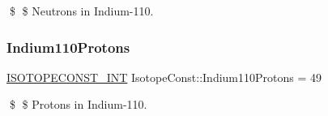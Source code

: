 \$ \$ Neutrons in Indium-\/110. \mbox{\label{group___isotope_const-_indium-_in110_ga3eb5f874d2904cc25ff4b0c7fe9475ab}} 
\subsubsection{\texorpdfstring{Indium110\+Protons}{Indium110Protons}}
{\footnotesize\ttfamily \mbox{\hyperlink{group___isotope_const-_macros_ga5f18360b3e99483a35c32d789e62621c}{I\+S\+O\+T\+O\+P\+E\+C\+O\+N\+S\+T\+\_\+\+I\+NT}} Isotope\+Const\+::\+Indium110\+Protons = 49}

\$ \$ Protons in Indium-\/110. 